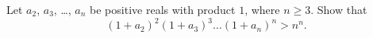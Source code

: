 Let $a_2$, $a_3$, \dots, $a_n$ be positive reals with product $1$,
where $n \ge 3$.
Show that
\[ (1+a_2)^2 (1+a_3)^3 \dots (1+a_n)^n > n^n. \]